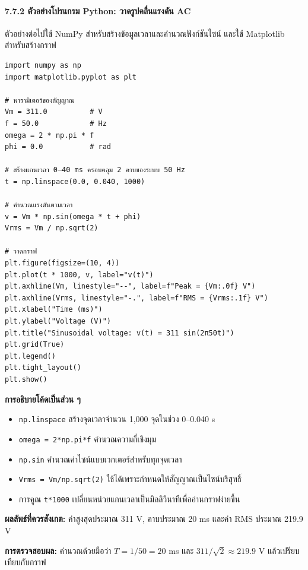 \paragraph{7.7.2 ตัวอย่างโปรแกรม Python: วาดรูปคลื่นแรงดัน AC}

ตัวอย่างต่อไปใช้ NumPy สำหรับสร้างข้อมูลเวลาและคำนวณฟังก์ชันไซน์ และใช้ Matplotlib สำหรับสร้างกราฟ

\begin{verbatim}
import numpy as np
import matplotlib.pyplot as plt

# พารามิเตอร์ของสัญญาณ
Vm = 311.0          # V
f = 50.0            # Hz
omega = 2 * np.pi * f
phi = 0.0           # rad

# สร้างแกนเวลา 0–40 ms ครอบคลุม 2 คาบของระบบ 50 Hz
t = np.linspace(0.0, 0.040, 1000)

# คำนวณแรงดันตามเวลา
v = Vm * np.sin(omega * t + phi)
Vrms = Vm / np.sqrt(2)

# วาดกราฟ
plt.figure(figsize=(10, 4))
plt.plot(t * 1000, v, label="v(t)")
plt.axhline(Vm, linestyle="--", label=f"Peak = {Vm:.0f} V")
plt.axhline(Vrms, linestyle="-.", label=f"RMS = {Vrms:.1f} V")
plt.xlabel("Time (ms)")
plt.ylabel("Voltage (V)")
plt.title("Sinusoidal voltage: v(t) = 311 sin(2π50t)")
plt.grid(True)
plt.legend()
plt.tight_layout()
plt.show()
\end{verbatim}

\textbf{การอธิบายโค้ดเป็นส่วน ๆ}

\begin{itemize}
    \item \texttt{np.linspace} สร้างจุดเวลาจำนวน 1,000 จุดในช่วง 0–0.040 s
    \item \texttt{omega = 2*np.pi*f} คำนวณความถี่เชิงมุม
    \item \texttt{np.sin} คำนวณค่าไซน์แบบเวกเตอร์สำหรับทุกจุดเวลา
    \item \texttt{Vrms = Vm/np.sqrt(2)} ใช้ได้เพราะกำหนดให้สัญญาณเป็นไซน์บริสุทธิ์
    \item การคูณ \texttt{t*1000} เปลี่ยนหน่วยแกนเวลาเป็นมิลลิวินาทีเพื่ออ่านกราฟง่ายขึ้น
\end{itemize}

\textbf{ผลลัพธ์ที่ควรสังเกต:} ค่าสูงสุดประมาณ 311 V, คาบประมาณ 20 ms และค่า RMS ประมาณ 219.9 V

\textbf{การตรวจสอบผล:} คำนวณด้วยมือว่า $T=1/50=20$ ms และ $311/\sqrt{2}\approx219.9$ V แล้วเปรียบเทียบกับกราฟ

